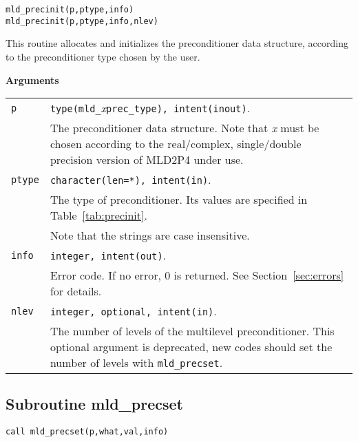 \begin{center}
\verb|mld_precinit(p,ptype,info)| \\
\verb|mld_precinit(p,ptype,info,nlev)| \\
\end{center}

\noindent
This routine allocates and initializes the preconditioner data structure,
according to the preconditioner type chosen by the user.

{\baselineskip\noindent\large\bfseries Arguments}

\begin{tabular}{p{1.2cm}p{12cm}}
\verb|p|      & \verb|type(mld_|\emph{x}\verb|prec_type), intent(inout)|.\\
              & The preconditioner data structure. Note that \emph{x}
                must be chosen according to the real/complex, single/double
                precision version of MLD2P4 under use.\\
\verb|ptype|  & \verb|character(len=*), intent(in)|.\\
              & The type of preconditioner. Its values are specified
              in Table~\ref{tab:precinit}.\\
              & Note that the strings are case insensitive.\\
\verb|info|   & \verb|integer, intent(out)|.\\
              & Error code. If no error, 0 is returned. See Section~\ref{sec:errors} for details.\\
\verb|nlev|   & \verb|integer, optional, intent(in)|.\\
              & The number of levels of the multilevel
                preconditioner. This optional argument is deprecated,
                new codes should set the number of levels with \verb|mld_precset|.\\
\end{tabular}

\clearpage

\subsection{Subroutine mld\_precset\label{sec:precset}}

\begin{center}
\verb|call mld_precset(p,what,val,info)|
\end{center}

